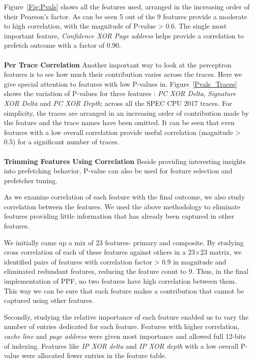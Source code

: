 Figure~\ref{Fig:Pvals} shows all the features used, arranged in the increasing
order of their Pearson's factor.  As can be seen 5 out of the 9
features provide a moderate to high correlation, with the magnitude of
P-value > 0.6.  The single most important feature, 
\textit{Confidence XOR Page address} helps provide
a correlation to prefetch outcome with a factor of 0.90. \\ \\
%
\textbf{Per Trace Correlation} \newline Another important way to look
at the perceptron features is to see how much their contribution
varies across the traces.  Here we give special attention to features
with low P-values in.  Figure~\ref{Pvals_Traces} shows the
variation of P-values for three features : \textit{PC XOR Delta},
\textit{Signature XOR Delta} and 
\textit{PC XOR Depth}; across all the SPEC CPU 2017 traces.  
For simplicity, the traces are arranged in an
increasing order of contribution made by the feature and the trace
names have been omitted.  It can be seen that even features with a low
overall correlation provide useful correlation (magnitude > 0.5) for
a significant number of traces. \\ \\
%
\textbf{Trimming Features Using Correlation} \newline Beside
providing interesting insights into prefetching behavior, P-value can
also be used for feature selection and prefetcher tuning.

As we examine correlation of each feature with the final outcome, we also
study correlation between the features.  We used the above methodology to
eliminate features providing little information that has already been captured
in other features.

We initially came up a mix of 23 features- primary and composite.  By studying
cross correlation of each of these features against others in a 23$\times$23
matrix, we identified pairs of features with correlation factor > 0.9 in
magnitude and eliminated redundant features, reducing the feature count to 9.
Thus, in the final implementation of PPF, no two features have high
correlation between them.  This way we can be sure that each feature makes a
contribution that cannot be captured using other features.

Secondly, studying the relative importance of each feature enabled us to vary
the number of entries dedicated for each feature.  Features with higher
correlation, \textit{cache line} and \textit{page address} were given most
importance and allowed full 12-bits of indexing.  Features like \textit{IP XOR
delta} and \textit{IP XOR depth} with a low overall P-value were allocated
fewer entries in the feature table.

